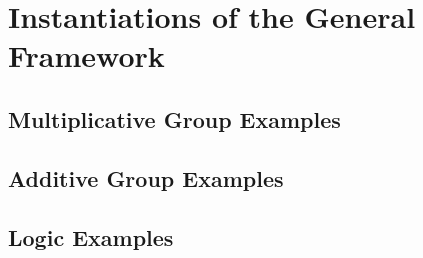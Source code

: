 \section{Instantiations of the General Framework}
\label{sec:instantiations}

\subsection{Multiplicative Group Examples}
\label{sec:multiplicative-examples}

\subsection{Additive Group Examples}
\label{sec:additive-examples}

\subsection{Logic Examples}
\label{sec:logic-examples}

